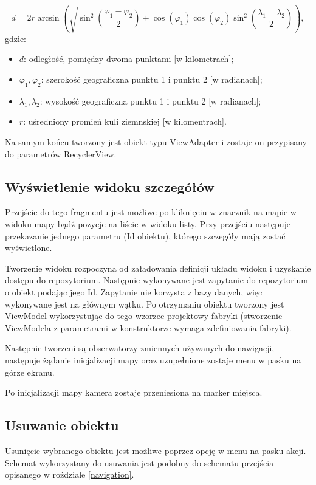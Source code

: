 \documentclass[polish,polish,a4paper,12pt]{article}
\begin{document}
	\begin{equation}
d = 2r\arcsin(\sqrt{\sin^2(\frac{\varphi_1-\varphi_2}{2})+\cos(\varphi_1)\cos(\varphi_2)\sin^2(\frac{\lambda_1-\lambda_2}{2})}),\label{eq:1}
	\end{equation}
	gdzie:
	\begin{itemize}
		\item $ d $: odległość, pomiędzy dwoma punktami [w kilometrach];
		\item $ \varphi_1, \varphi_2 $: szerokość geograficzna punktu 1 i punktu 2 [w radianach];
		\item $ \lambda_1, \lambda_2 $: wysokość geograficzna punktu 1 i punktu 2 [w radianach];
		\item $ r $: uśredniony promień kuli ziemnskiej [w kilomentrach].
	\end{itemize}

	Na samym końcu tworzony jest obiekt typu ViewAdapter i zostaje on przypisany do parametrów RecyclerView.

	\subsection{Wyświetlenie widoku szczegółów}

	Przejście do tego fragmentu jest możliwe po kliknięciu w znacznik na mapie w widoku mapy bądź pozycje na liście w widoku listy. Przy przejściu następuje przekazanie jednego parametru (Id obiektu), którego szczegóły mają zostać wyświetlone.

	Tworzenie widoku rozpoczyna od załadowania definicji układu widoku i uzyskanie dostępu do repozytorium. Następnie wykonywane jest zapytanie do repozytorium o obiekt podając jego Id. Zapytanie nie korzysta z bazy danych, więc wykonywane jest na głównym wątku. Po otrzymaniu obiektu tworzony jest ViewModel wykorzystując do tego wzorzec projektowy fabryki (stworzenie ViewModela z parametrami w konstruktorze wymaga zdefiniowania fabryki).

	Następnie tworzeni są obserwatorzy zmiennych używanych do nawigacji, następuje żądanie inicjalizacji mapy oraz uzupełnione zostaje menu w pasku na górze ekranu.

	Po inicjalizacji mapy kamera zostaje przeniesiona na marker miejsca.

	\subsection{Usuwanie obiektu}

	Usunięcie wybranego obiektu jest możliwe poprzez opcję w menu na pasku akcji. Schemat wykorzystany do usuwania jest podobny do schematu przejścia opisanego w roździale \ref{navigation}.
\end{document}
